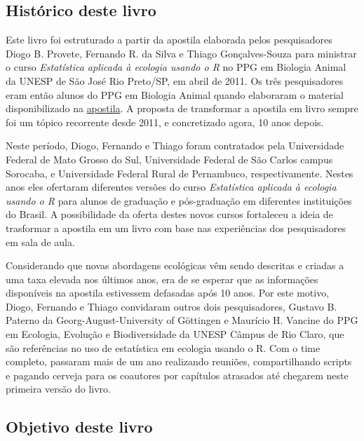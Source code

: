 \documentclass[
]{article}
\begin{document}
\hypertarget{histuxf3rico-deste-livro}{%
\subsection{Histórico deste livro}\label{histuxf3rico-deste-livro}}

Este livro foi estruturado a partir da apostila elaborada pelos pesquisadores Diogo B. Provete, Fernando R. da Silva e Thiago Gonçalves-Souza para ministrar o curso \emph{Estatística aplicada à ecologia usando o R} no PPG em Biologia Animal da UNESP de São José Rio Preto/SP, em abril de 2011. Os três pesquisadores eram então alunos do PPG em Biologia Animal quando elaboraram o material disponibilizado na \href{(https://cran.r-project.org/doc/contrib/Provete-Estatistica_aplicada.pdf)}{apostila}. A proposta de transformar a apostila em livro sempre foi um tópico recorrente desde 2011, e concretizado agora, 10 anos depois.

Neste período, Diogo, Fernando e Thiago foram contratados pela Universidade Federal de Mato Grosso do Sul, Universidade Federal de São Carlos campus Sorocaba, e Universidade Federal Rural de Pernambuco, respectivamente. Nestes anos eles ofertaram diferentes versões do curso \emph{Estatística aplicada à ecologia usando o R} para alunos de graduação e pós-graduação em diferentes instituições do Brasil. A possibilidade da oferta destes novos cursos fortaleceu a ideia de trasformar a apostila em um livro com base nas experiências dos pesquisadores em sala de aula.

Considerando que novas abordagens ecológicas vêm sendo descritas e criadas a uma taxa elevada nos últimos anos, era de se esperar que as informações disponíveis na apostila estivessem defasadas após 10 anos. Por este motivo, Diogo, Fernando e Thiago convidaram outros dois pesquisadores, Gustavo B. Paterno da Georg-August-University of Göttingen e Maurício H. Vancine do PPG em Ecologia, Evolução e Biodiversidade da UNESP Câmpus de Rio Claro, que são referências no uso de estatística em ecologia usando o R. Com o time completo, passaram mais de um ano realizando reuniões, compartilhando scripts e pagando cerveja para os coautores por capítulos atrasados até chegarem neste primeira versão do livro.

\hypertarget{objetivo-deste-livro}{%
\subsection{Objetivo deste livro}\label{objetivo-deste-livro}}
\end{document}
